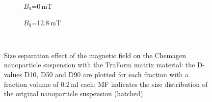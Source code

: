 \begin{figure}
          \begin{subfigure}{0.49\textwidth}
                  \flushleft
                  \caption{$B_{0}$=0\,mT}\label{subfig:chemagen_size_0mT}
          \end{subfigure}\hfill
        \begin{subfigure}{0.49\textwidth}
                \flushright
                \caption{$B_{0}$=12.8\,mT}\label{subfig:chemagen_size_128mT}
        \end{subfigure}
        \\        
        \caption[Size separation effect of the magnetic field on the Chemagen nanoparticle suspension with the TruForm matrix material]{Size separation effect of the magnetic field on the Chemagen nanoparticle suspension with the TruForm matrix material: the D-values D10, D50 and D90 are plotted for each fraction with a fraction volume of 0.2\,ml each; MF indicates the size distribution of the original nanoparticle suspension (hatched)}
        \label{fig:chemagen_size_separation}
  \end{figure}
  
